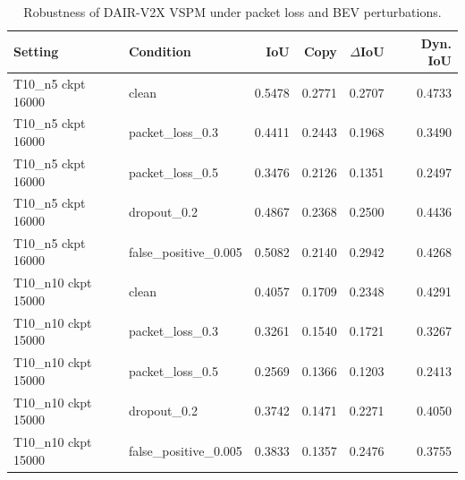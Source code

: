 \begin{table}[t]
\centering
\scriptsize
\caption{Robustness of DAIR-V2X VSPM under packet loss and BEV perturbations.}
\label{tab:dair-robustness}
\begin{tabular}{llrrrr}
\toprule
Setting & Condition & IoU & Copy & $\Delta$IoU & Dyn. IoU \\
\midrule
T10\_n5 ckpt 16000 & clean & 0.5478 & 0.2771 & 0.2707 & 0.4733 \\
T10\_n5 ckpt 16000 & packet\_loss\_0.3 & 0.4411 & 0.2443 & 0.1968 & 0.3490 \\
T10\_n5 ckpt 16000 & packet\_loss\_0.5 & 0.3476 & 0.2126 & 0.1351 & 0.2497 \\
T10\_n5 ckpt 16000 & dropout\_0.2 & 0.4867 & 0.2368 & 0.2500 & 0.4436 \\
T10\_n5 ckpt 16000 & false\_positive\_0.005 & 0.5082 & 0.2140 & 0.2942 & 0.4268 \\
T10\_n10 ckpt 15000 & clean & 0.4057 & 0.1709 & 0.2348 & 0.4291 \\
T10\_n10 ckpt 15000 & packet\_loss\_0.3 & 0.3261 & 0.1540 & 0.1721 & 0.3267 \\
T10\_n10 ckpt 15000 & packet\_loss\_0.5 & 0.2569 & 0.1366 & 0.1203 & 0.2413 \\
T10\_n10 ckpt 15000 & dropout\_0.2 & 0.3742 & 0.1471 & 0.2271 & 0.4050 \\
T10\_n10 ckpt 15000 & false\_positive\_0.005 & 0.3833 & 0.1357 & 0.2476 & 0.3755 \\
\bottomrule
\end{tabular}
\end{table}
